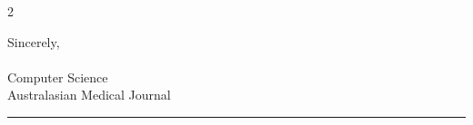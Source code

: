 \documentclass{article}
\begin{document}
\begin{multicols*}{2}
\noindent
\begin{minipage}{\linewidth}
\noindent Sincerely,
\\[1em]
\\
Computer Science\\
Australasian Medical Journal\\[0.5em]
\noindent\rule{\linewidth}{2.2pt}
\end{minipage}

\end{multicols*}
\end{document}
